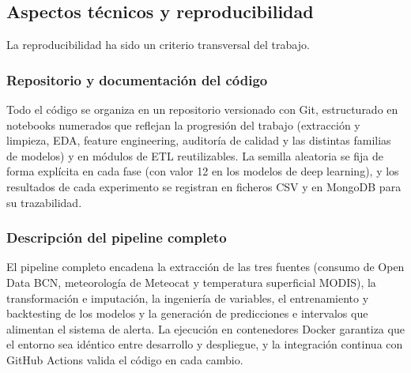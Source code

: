 \documentclass[12pt, a4paper]{article}
\begin{document}
\subsection{Aspectos técnicos y reproducibilidad}

La reproducibilidad ha sido un criterio transversal del trabajo.

\subsubsection{Repositorio y documentación del código}

Todo el código se organiza en un repositorio versionado con Git, estructurado en notebooks numerados que reflejan la progresión del trabajo (extracción y limpieza, EDA, feature engineering, auditoría de calidad y las distintas familias de modelos) y en módulos de ETL reutilizables. La semilla aleatoria se fija de forma explícita en cada fase (con valor 12 en los modelos de deep learning), y los resultados de cada experimento se registran en ficheros CSV y en MongoDB para su trazabilidad.

\subsubsection{Descripción del pipeline completo}

El pipeline completo encadena la extracción de las tres fuentes (consumo de Open Data BCN, meteorología de Meteocat y temperatura superficial MODIS), la transformación e imputación, la ingeniería de variables, el entrenamiento y backtesting de los modelos y la generación de predicciones e intervalos que alimentan el sistema de alerta. La ejecución en contenedores Docker garantiza que el entorno sea idéntico entre desarrollo y despliegue, y la integración continua con GitHub Actions valida el código en cada cambio.
\end{document}
